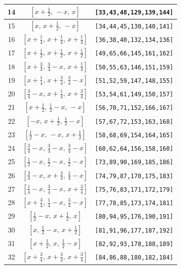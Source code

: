 \documentclass[fleqn,8pt]{jsarticle}
\begin{document}
\begin{longtable}{ccc}
14 & $\left[ x + \frac{1}{2},\, - x,\, x \right]$ & {\tt [33,43,48,129,139,144]} \\ \hline
15 & $\left[ x,\, x + \frac{1}{2},\, - x \right]$ & {\tt [34,44,45,130,140,141]} \\ \hline
16 & $\left[ x + \frac{1}{4},\, x + \frac{1}{4},\, x + \frac{1}{4} \right]$ & {\tt [36,38,40,132,134,136]} \\ \hline
17 & $\left[ x + \frac{1}{2},\, x + \frac{1}{2},\, x + \frac{1}{2} \right]$ & {\tt [49,65,66,145,161,162]} \\ \hline
18 & $\left[ x + \frac{3}{4},\, \frac{3}{4} - x,\, x + \frac{1}{4} \right]$ & {\tt [50,55,63,146,151,159]} \\ \hline
19 & $\left[ x + \frac{1}{4},\, x + \frac{3}{4},\, \frac{3}{4} - x \right]$ & {\tt [51,52,59,147,148,155]} \\ \hline
20 & $\left[ \frac{3}{4} - x,\, x + \frac{1}{4},\, x + \frac{3}{4} \right]$ & {\tt [53,54,61,149,150,157]} \\ \hline
21 & $\left[ x + \frac{1}{2},\, \frac{1}{2} - x,\, - x \right]$ & {\tt [56,70,71,152,166,167]} \\ \hline
22 & $\left[ - x,\, x + \frac{1}{2},\, \frac{1}{2} - x \right]$ & {\tt [57,67,72,153,163,168]} \\ \hline
23 & $\left[ \frac{1}{2} - x,\, - x,\, x + \frac{1}{2} \right]$ & {\tt [58,68,69,154,164,165]} \\ \hline
24 & $\left[ \frac{3}{4} - x,\, \frac{3}{4} - x,\, \frac{3}{4} - x \right]$ & {\tt [60,62,64,156,158,160]} \\ \hline
25 & $\left[ \frac{1}{2} - x,\, \frac{1}{2} - x,\, \frac{1}{2} - x \right]$ & {\tt [73,89,90,169,185,186]} \\ \hline
26 & $\left[ \frac{3}{4} - x,\, x + \frac{3}{4},\, \frac{1}{4} - x \right]$ & {\tt [74,79,87,170,175,183]} \\ \hline
27 & $\left[ \frac{1}{4} - x,\, \frac{3}{4} - x,\, x + \frac{3}{4} \right]$ & {\tt [75,76,83,171,172,179]} \\ \hline
28 & $\left[ x + \frac{3}{4},\, \frac{1}{4} - x,\, \frac{3}{4} - x \right]$ & {\tt [77,78,85,173,174,181]} \\ \hline
29 & $\left[ \frac{1}{2} - x,\, x + \frac{1}{2},\, x \right]$ & {\tt [80,94,95,176,190,191]} \\ \hline
30 & $\left[ x,\, \frac{1}{2} - x,\, x + \frac{1}{2} \right]$ & {\tt [81,91,96,177,187,192]} \\ \hline
31 & $\left[ x + \frac{1}{2},\, x,\, \frac{1}{2} - x \right]$ & {\tt [82,92,93,178,188,189]} \\ \hline
32 & $\left[ x + \frac{3}{4},\, x + \frac{3}{4},\, x + \frac{3}{4} \right]$ & {\tt [84,86,88,180,182,184]} \\
\end{longtable}
\end{document}

